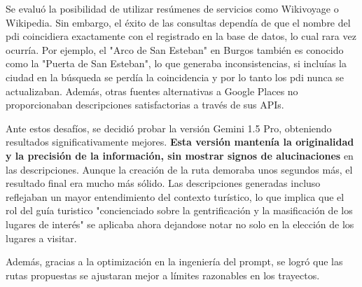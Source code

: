 Se evaluó la posibilidad de utilizar resúmenes de servicios como Wikivoyage o Wikipedia. Sin embargo, el éxito de las consultas dependía de que el nombre del \acrshort{pdi} coincidiera exactamente con el registrado en la base de datos, lo cual rara vez ocurría. Por ejemplo, el "Arco de San Esteban" en Burgos también es conocido como la "Puerta de San Esteban", lo que generaba inconsistencias, si incluías la ciudad en la búsqueda se perdía la coincidencia y por lo tanto los \acrlong{pdi} nunca se actualizaban. Además, otras fuentes alternativas a Google Places no proporcionaban descripciones satisfactorias a través de sus APIs.

Ante estos desafíos, se decidió probar la versión Gemini 1.5 Pro, obteniendo resultados significativamente mejores. \textbf{Esta versión mantenía la originalidad y la precisión de la información, sin mostrar signos de alucinaciones} en las descripciones. Aunque la creación de la ruta demoraba unos segundos más, el resultado final era mucho más sólido. Las descripciones generadas incluso reflejaban un mayor entendimiento del contexto turístico, lo que implica que el rol del guía turistico "concienciado sobre la gentrificación y la masificación de los lugares de interés" se aplicaba ahora dejandose notar no solo en la elección de los lugares a visitar.

Además, gracias a la optimización en la ingeniería del prompt, se logró que las rutas propuestas se ajustaran mejor a límites razonables en los trayectos.
